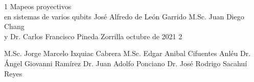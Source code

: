 \documentclass[letterpaper,12pt]{thesisECFM}
\theoremstyle{plain}
\theoremstyle{definition}
\theoremstyle{remark}
\newcommand{\1}{\mathbb{1}}
\begin{document}
\datosThesis%
{1}%
{Mapeos proyectivos\\en sistemas de varios qubits}%
{José Alfredo de León Garrido}%
{M.Sc. Juan Diego Chang\\y Dr. Carlos Francisco
Pineda Zorrilla}%
{octubre de 2021}		%
{2}							%

\examenPrivado%
{M.Sc. Jorge Marcelo Ixquiac Cabrera}%
{M.Sc. Edgar Anibal Cifuentes Anléu}%
{Dr. Ángel Giovanni Ramírez}%
{Dr. Juan Adolfo Ponciano}%
{Dr. José Rodrigo Sacahuí Reyes}%

{\onehalfspacing	%




\par}
 
\frontmatter    %

{\onehalfspacing	%

\tableofcontents    %





\mainmatter     %





{\backmatter     %




}

\appendix			%



\par}               %
\end{document}
